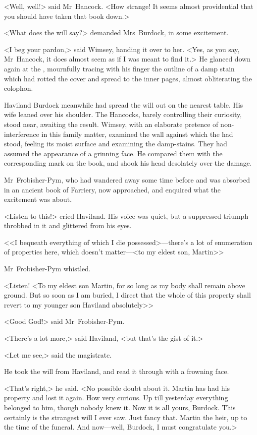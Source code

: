 <Well, well!> said Mr~Hancock. <How strange! It seems almost providential that you should have taken that book down.>

<What does the will say?> demanded Mrs~Burdock, in some excitement.

<I beg your pardon,> said Wimsey, handing it over to her. <Yes, as you say, Mr~Hancock, it does almost seem as if I was meant to find it.> He glanced down again at the , mournfully tracing with his finger the outline of a damp stain which had rotted the cover and spread to the inner pages, almost obliterating the colophon.

Haviland Burdock meanwhile had spread the will out on the nearest table. His wife leaned over his shoulder. The Hancocks, barely controlling their curiosity, stood near, awaiting the result. Wimsey, with an elaborate pretence of non-interference in this family matter, examined the wall against which the  had stood, feeling its moist surface and examining the damp-stains. They had assumed the appearance of a grinning face. He compared them with the corresponding mark on the book, and shook his head desolately over the damage.

Mr~Frobisher-Pym, who had wandered away some time before and was absorbed in an ancient book of Farriery, now approached, and enquired what the excitement was about.

<Listen to this!> cried Haviland. His voice was quiet, but a suppressed triumph throbbed in it and glittered from his eyes.

<<I bequeath everything of which I die possessed>—there's a lot of enumeration of properties here, which doesn't matter—<to my eldest son, Martin>\longdash>

Mr~Frobisher-Pym whistled.

<Listen! <To my eldest son Martin, for so long as my body shall remain above ground. But so soon as I am buried, I direct that the whole of this property shall revert to my younger son Haviland absolutely>\longdash>

<Good God!> said Mr~Frobisher-Pym.

<There's a lot more,> said Haviland, <but that's the gist of it.>

<Let me see,> said the magistrate.

He took the will from Haviland, and read it through with a frowning face.

<That's right,> he said. <No possible doubt about it. Martin has had his property and lost it again. How very curious. Up till yesterday everything belonged to him, though nobody knew it. Now it is all yours, Burdock. This certainly is the strangest will I ever saw. Just fancy that. Martin the heir, up to the time of the funeral. And now—well, Burdock, I must congratulate you.>

